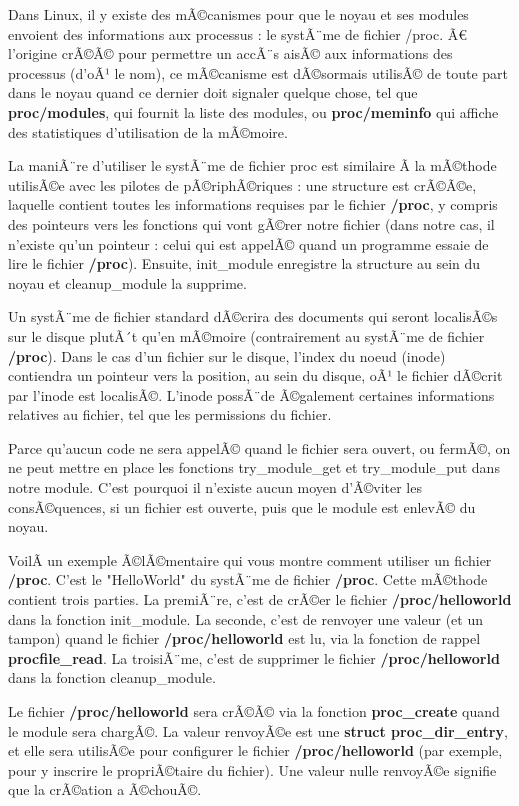 \documentclass[11pt]{article}
\begin{document}
Dans Linux, il y existe des mÃ©canismes pour que le noyau et ses modules envoient des informations aux processus : le systÃ¨me de fichier /proc. Ã€ l'origine crÃ©Ã© pour permettre un accÃ¨s aisÃ© aux informations des processus (d'oÃ¹ le nom), ce mÃ©canisme est dÃ©sormais utilisÃ© de toute part dans le noyau quand ce dernier doit signaler quelque chose, tel que \textbf{proc/modules}, qui fournit la liste des modules, ou \textbf{proc/meminfo} qui affiche des statistiques d'utilisation de la mÃ©moire.

La maniÃ¨re d'utiliser le systÃ¨me de fichier proc est similaire Ã  la mÃ©thode utilisÃ©e avec les pilotes de pÃ©riphÃ©riques : une structure est crÃ©Ã©e, laquelle contient toutes les informations requises par le fichier \textbf{/proc}, y compris des pointeurs vers les fonctions qui vont gÃ©rer notre fichier (dans notre cas, il n'existe qu'un pointeur : celui qui est appelÃ© quand un programme essaie de lire le fichier \textbf{/proc}). Ensuite, init\_module enregistre la structure au sein du noyau et cleanup\_module la supprime.

Un systÃ¨me de fichier standard dÃ©crira des documents qui seront localisÃ©s sur le disque plutÃ´t qu'en mÃ©moire (contrairement au systÃ¨me de fichier \textbf{/proc}).  Dans le cas d'un fichier sur le disque, l'index du noeud (inode) contiendra un pointeur vers la position, au sein du disque, oÃ¹ le fichier dÃ©crit par l'inode est localisÃ©. L'inode possÃ¨de Ã©galement certaines informations relatives au fichier, tel que les permissions du fichier.

Parce qu'aucun code ne sera appelÃ© quand le fichier sera ouvert, ou fermÃ©, on ne peut mettre en place les fonctions try\_module\_get et try\_module\_put dans notre module. C'est pourquoi il n'existe aucun moyen d'Ã©viter les consÃ©quences, si un fichier est ouverte, puis que le module est enlevÃ© du noyau.

VoilÃ  un exemple Ã©lÃ©mentaire qui vous montre comment utiliser un fichier \textbf{/proc}. C'est le "HelloWorld" du systÃ¨me de fichier \textbf{/proc}. Cette mÃ©thode contient trois parties. La premiÃ¨re, c'est de crÃ©er le fichier \textbf{/proc/helloworld} dans la fonction init\_module. La seconde, c'est de renvoyer une valeur (et un tampon) quand le fichier \textbf{/proc/helloworld} est lu, via la fonction de rappel \textbf{procfile\_read}. La troisiÃ¨me, c'est de supprimer le fichier \textbf{/proc/helloworld} dans la fonction cleanup\_module.

Le fichier \textbf{/proc/helloworld} sera crÃ©Ã© via la fonction \textbf{proc\_create} quand le module sera chargÃ©. La valeur renvoyÃ©e est une \textbf{struct proc\_dir\_entry}, et elle sera utilisÃ©e pour configurer le fichier \textbf{/proc/helloworld} (par exemple, pour y inscrire le propriÃ©taire du fichier). Une valeur nulle renvoyÃ©e signifie que la crÃ©ation a Ã©chouÃ©.
\end{document}
